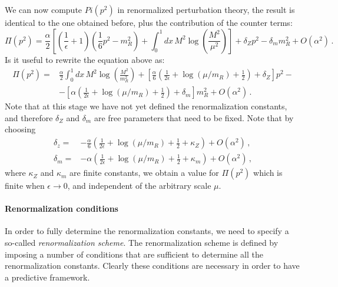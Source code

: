 We can now compute $Pi(p^2)$ in renormalized perturbation theory, the
result is identical to the one obtained before, plus the contribution
of the counter terms:
\begin{equation}
  \label{eq:PiRenormPertTh}
  \Pi(p^2)=\frac{\alpha}{2}\left[
    \left(\frac{1}{\epsilon}+1\right)
    \left(\frac{1}{6}p^2-m_R^2\right) +
    \int_0^1dx\, M^2\log\left(\frac{M^2}{\mu^2}\right)
  \right] + \delta_Z p^2 - \delta_m m_R^2 + O(\alpha^2)\, .
\end{equation}
Is it useful to rewrite the equation above as:
\begin{align}
  \Pi(p^2)
  =& \frac{\alpha}{2}\int_0^1dx\,
     M^2\log\left(\frac{M^2}{m_R^2}\right) +
     \left[
     \frac{\alpha}{6} \left(\frac{1}{2\epsilon} + \log(\mu/m_R) +
     \frac12 \right) + \delta_Z
     \right] p^2 - \nonumber \\
   & - \left[
     \alpha\left(\frac{1}{2\epsilon} + \log(\mu/m_R) +
     \frac12 \right) + \delta_m
     \right] m_R^2 + O\left(\alpha^2\right)\, .
\end{align}
Note that at this stage we have not yet defined the renormalization
constants, and therefore $\delta_Z$ and $\delta_m$ are free parameters
that need to be fixed.  Note that by choosing
\begin{align}
  \delta_z =& -\frac{\alpha}{6} \left(\frac{1}{2\epsilon} + \log(\mu/m_R) +
              \frac12 + \kappa_Z \right) + O\left(\alpha^2\right)\, , \\
  \delta_m =& -\alpha\left(\frac{1}{2\epsilon} + \log(\mu/m_R) +
     \frac12 + \kappa_m\right) + O\left(\alpha^2\right)\, , 
\end{align}
where $\kappa_Z$ and $\kappa_m$ are finite constants, we obtain a
value for $\Pi(p^2)$ which is finite when $\epsilon\to 0$, and
independent of the arbitrary scale $\mu$.

\paragraph{Renormalization conditions}

In order to fully determine the renormalization constants, we need to
specify a so-called {\em renormalization scheme}. The renormalization
scheme is defined by imposing a number of conditions that are
sufficient to determine all the renormalization constants. Clearly these
conditions are necessary in order to have a predictive framework.



